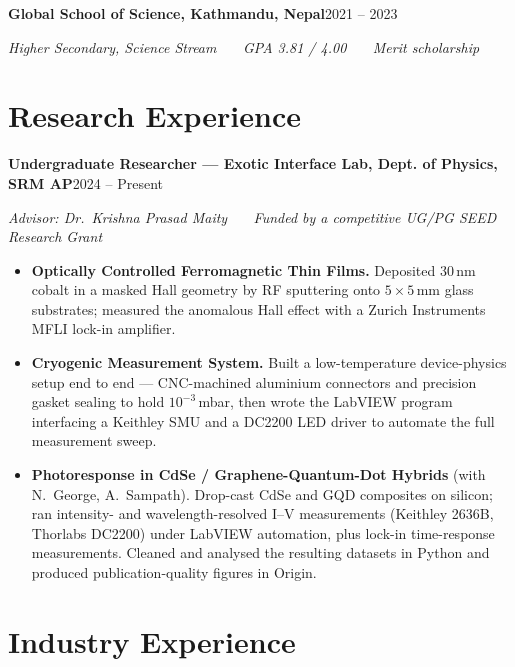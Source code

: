 \documentclass[a4paper,10pt]{article}
\newcommand{\entry}[2]{\textbf{#1}\hfill{\small #2}\par}
\newcommand{\sub}[1]{{\small\itshape #1}\par\vspace{1pt}}
\begin{document}
\entry{Global School of Science, Kathmandu, Nepal}{2021 -- 2023}
\sub{Higher Secondary, Science Stream \ \textbar\ \ GPA 3.81 / 4.00 \ \textbar\ \ Merit scholarship}

\section*{Research Experience}

\entry{Undergraduate Researcher --- Exotic Interface Lab, Dept. of Physics, SRM AP}{2024 -- Present}
\sub{Advisor: Dr.\ Krishna Prasad Maity \ \textbar\ \ Funded by a competitive UG/PG SEED Research Grant}
\begin{itemize}
    \item \textbf{Optically Controlled Ferromagnetic Thin Films.} Deposited 30\,nm cobalt in a masked Hall geometry
          by RF sputtering onto $5\times5$\,mm glass substrates; measured the anomalous Hall effect with a Zurich
          Instruments MFLI lock-in amplifier.
    \item \textbf{Cryogenic Measurement System.} Built a low-temperature device-physics setup end to end ---
          CNC-machined aluminium connectors and precision gasket sealing to hold $10^{-3}$\,mbar, then wrote the
          LabVIEW program interfacing a Keithley SMU and a DC2200 LED driver to automate the full measurement sweep.
    \item \textbf{Photoresponse in CdSe / Graphene-Quantum-Dot Hybrids} (with N.\ George, A.\ Sampath).
          Drop-cast CdSe and GQD composites on silicon; ran intensity- and wavelength-resolved I--V measurements
          (Keithley 2636B, Thorlabs DC2200) under LabVIEW automation, plus lock-in time-response measurements.
          Cleaned and analysed the resulting datasets in Python and produced publication-quality figures in Origin.
\end{itemize}

\section*{Industry Experience}
\end{document}
